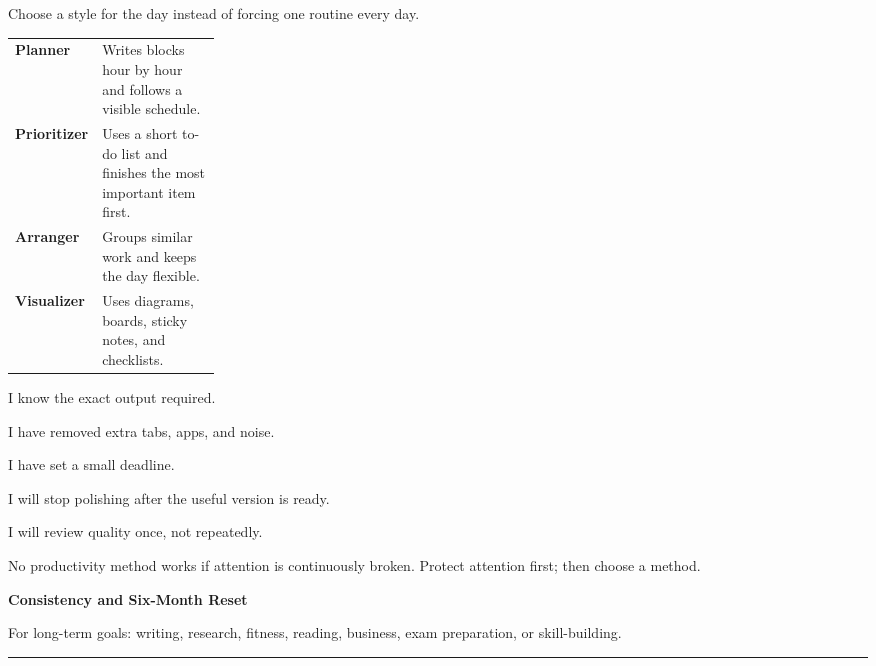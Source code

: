 \documentclass[10pt,a4paper]{article}
\newcommand{\CheckLine}{\raisebox{0.2ex}{\Large$\square$}\hspace{1mm}}
\newcommand{\pagetitle}[2]{%
  {\fontsize{26}{29}\selectfont\bfseries #1}\par
  {\large\color{SoftInk}#2}\par\vspace{3mm}\hrule\vspace{4mm}
}
\begin{document}
\begin{minipage}[t]{0.48\linewidth}
\begin{tcolorbox}[usebox,title={Find your work style}]
Choose a style for the day instead of forcing one routine every day.
\begin{tabularx}{\linewidth}{>{\bfseries}p{0.24\linewidth}X}
Planner & Writes blocks hour by hour and follows a visible schedule.\\
Prioritizer & Uses a short to-do list and finishes the most important item first.\\
Arranger & Groups similar work and keeps the day flexible.\\
Visualizer & Uses diagrams, boards, sticky notes, and checklists.\\
\end{tabularx}
\end{tcolorbox}

\begin{tcolorbox}[usebox,title={Compression checklist}]
\CheckLine I know the exact output required.\par
\CheckLine I have removed extra tabs, apps, and noise.\par
\CheckLine I have set a small deadline.\par
\CheckLine I will stop polishing after the useful version is ready.\par
\CheckLine I will review quality once, not repeatedly.
\end{tcolorbox}

\begin{tcolorbox}[usebox,title={Important note}]
No productivity method works if attention is continuously broken. Protect attention first; then choose a method.
\end{tcolorbox}
\end{minipage}


\newpage

\pagetitle{Consistency and Six-Month Reset}{For long-term goals: writing, research, fitness, reading, business, exam preparation, or skill-building.}
\end{document}
